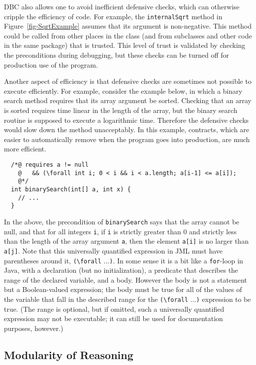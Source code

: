 \documentclass{jotarticle}
\begin{document}
DBC also allows one to avoid inefficient defensive checks, which can
otherwise cripple the efficiency of code.
For example, the \texttt{internalSqrt} method in
Figure~\ref{fig-SqrtExample} assumes that its argument is
non-negative.  This method could be called from other places in the
class (and from subclasses and other code in the same package) that is
trusted.  This level of trust is validated by checking the
preconditions during debugging, but these checks can be turned off for
production use of the program.

Another aspect of efficiency is that defensive checks are sometimes
not possible to execute efficiently.  For example, consider the
example below, in which a binary search method requires that its array
argument be sorted.  Checking that an array is sorted requires time
linear in the length of the array, but the binary search routine is
supposed to execute a logarithmic time.  Therefore the defensive
checks would slow down the method unacceptably.  In this example,
contracts, which are easier to automatically remove when the program
goes into production, are much more efficient.

\begin{verbatim}
  /*@ requires a != null 
    @   && (\forall int i; 0 < i && i < a.length; a[i-1] <= a[i]);
    @*/
  int binarySearch(int[] a, int x) {
    // ... 
  }
\end{verbatim}

In the above, the precondition of \texttt{binarySearch} says that the
array cannot be null, and that for all integers \texttt{i},
if \texttt{i} is strictly greater than 0 and strictly less than the
length of the array argument \texttt{a}, then the element
\texttt{a[i]} is no larger than \texttt{a[j]}.
Note that this universally quantified expression in JML must have
parentheses around it, \verb|(\forall| $\dots$\verb|)|.
In some sense it is a bit like a \texttt{for}-loop in Java, with a
declaration (but no initialization), a predicate that describes the
range of the declared variable, and a body.  However the body is not a
statement but a Boolean-valued expression; the body must be true for
all of the values of the variable that fall in the described range for the
\verb|(\forall| $\dots$\verb|)| expression to be true.  (The range is
optional, but if omitted, such a universally quantified expression may
not be executable; it can still be used for documentation purposes, however.)

\subsection{Modularity of Reasoning}
\end{document}
